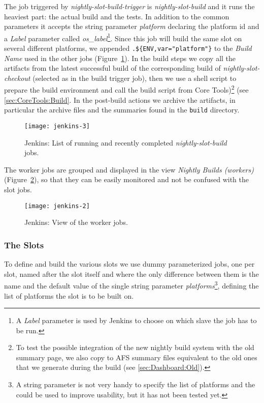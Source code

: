 The job triggered by \emph{nightly-slot-build-trigger} is
\emph{nightly-slot-build} and it runs the heaviest part: the actual build and
the tests.  In addition to the common parameters it accepts the string parameter
\emph{platform} declaring the platform id and a \emph{Label}
parameter called \emph{os\_label}\footnote{A \emph{Label} parameter is used by
Jenkins to choose on which slave the job has to be run.}.  Since this job will
build the same slot on several different platforms, we appended
\verb|.${ENV,var="platform"}| to the \emph{Build Name} used in the other jobs
(Figure~\ref{fig:jenkins-builds}).  In the build steps we copy all the artifacts
from the latest successful build of the corresponding build of
\emph{nightly-slot-checkout} (selected as in the build trigger job), then we use
a shell script to prepare the build environment and call the build script from
Core Tools)\footnote{To test the possible integration of the new nightly build
  system with the old summary page, we also copy to AFS summary files equivalent
  to the old ones that we generate during the build (see
\ref{sec:Dashboard:Old}).}
(see \ref{sec:CoreTools:Build}. In the post-build actions we archive the
artifacts,
in particular the archive files and the summaries found in the \texttt{build}
directory.

\begin{figure}
  \begin{center}
    \texttt{[image: jenkins-3]}
  \end{center}
  \caption{Jenkins: List of running and recently completed
  \emph{nightly-slot-build} jobs.}
  \label{fig:jenkins-builds}
\end{figure}

The worker jobs are grouped and displayed in the view \emph{Nightly Builds
(workers)} (Figure~\ref{fig:jenkins-workers}), so that they can be easily
monitored and not be confused with the slot jobs.

\begin{figure}
  \begin{center}
    \texttt{[image: jenkins-2]}
  \end{center}
  \caption{Jenkins: View of the worker jobs.}
  \label{fig:jenkins-workers}
\end{figure}


\subsubsection{The Slots}
\label{sec:Jenkins:Slots}
To define and build the various slots we use dummy parameterized jobs, one per
slot, named after the slot itself and where the only difference between them is
the name and the default value of the single string parameter
\emph{platforms}\footnote{A string parameter is not very handy to specify the
list of platforms and the
 could be used to improve usability, but it has
not been tested yet.}, defining the list of platforms the slot is to be built
on.

